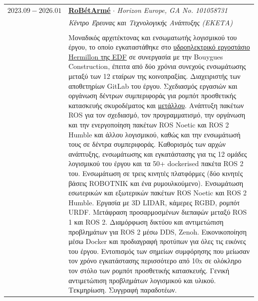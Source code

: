 \documentclass[a4paper,10pt,twoside]{article}
\begin{document}
\begin{tabular}{rp{11cm}}
$2023.09 - 2026.01$ & \href{https://www.robetarme-project.eu/}{\textbf{RoBétArmé}} $\cdot$ \textit{Horizon Europe, GA No. 101058731} \\
                           & \textit{Κέντρο Έρευνας και Τεχνολογικής Ανάπτυξης (ΕΚΕΤΑ)}\\
\\
                           & Μοναδικός αρχιτέκτονας και ενσωματωτής λογισμικού του έργου, το οποίο εγκαταστάθηκε στο \href{https://www.gem.wiki/Hermillon_hydroelectric_plant}{υδροηλεκτρικό εργοστάσιο Hermillon της EDF} σε συνεργασία με την Bouygues Construction, έπειτα από δύο χρόνια συνεχούς ενσωμάτωσης μεταξύ των 12 εταίρων της κοινοπραξίας. Διαχειριστής των αποθετηρίων GitLab του έργου. Σχεδιασμός εργασιών και οργάνωση δέντρων συμπεριφοράς για ρομπότ προσθετικής κατασκευής σκυροδέματος και \href{https://www.youtube.com/watch?v=xuIbOL-MPRk}{μετάλλου}. Ανάπτυξη πακέτων ROS για τον σχεδιασμό, τον προγραμματισμό, την οργάνωση και την ενεργοποίηση πακέτων ROS Noetic και ROS 2 Humble και άλλου λογισμικού, καθώς και την ενσωμάτωσή τους σε δέντρα συμπεριφοράς. Καθορισμός των αρχών ανάπτυξης, ενσωμάτωσης και εγκατάστασης για τις 12 ομάδες λογισμικού του έργου και τα 50+ dockerised πακέτα ROS 2 του. Ενσωμάτωση σε τρεις κινητές πλατφόρμες (δύο κινητές βάσεις ROBOTNIK και ένα ρυμουλκούμενο). Ενσωμάτωση εσωτερικών και εξωτερικών πακέτων ROS Noetic και ROS 2 Humble. Εργασία με 3D LIDAR, κάμερες RGBD, ρομπότ URDF. Μετάφραση προσαρμοσμένων διεπαφών μεταξύ ROS 1 και ROS 2. Διαμόρφωση δικτύου και αντιμετώπιση προβλημάτων για ROS 2 μέσω DDS, Zenoh. Εικονικοποίηση μέσω Docker και προδιαγραφή προτύπων για όλες τις εικόνες του έργου. Εντοπισμός των σημείων συμφόρησης που μείωσαν τον χρόνο εγκατάστασης περισσότερο από 10x σε ολόκληρο τον στόλο των ρομπότ προσθετικής κατασκευής. Γενική αντιμετώπιση προβλημάτων λογισμικού και υλικού. Τεκμηρίωση. Συγγραφή παραδοτέων. \\
\end{tabular}

\vspace{1.5em}
\end{document}
